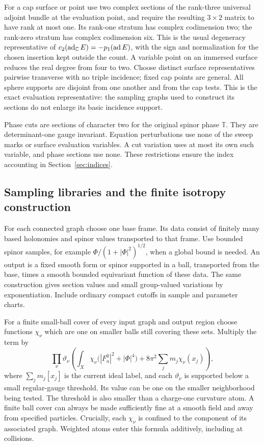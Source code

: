 For a cap surface or point use two complex sections of the rank-three
universal adjoint bundle at the evaluation point, and require the
resulting $3\times2$ matrix to have rank at most one.  Its rank-one
stratum has complex codimension two; the rank-zero stratum has complex
codimension six.  This is the usual degeneracy representative of
$c_2(\operatorname{ad}_{\mathbb C}E)=-p_1(\operatorname{ad} E)$, with the sign and normalization for the
chosen insertion kept outside the count.  A variable point on an
immersed surface reduces the real degree from four to two.  Choose
distinct surface representatives pairwise transverse with no triple
incidence; fixed cap points are general.  All sphere supports are
disjoint from one another and from the cap tests.  This is the exact
evaluation representative: the sampling graphs used to construct its
sections do not enlarge its basic incidence support.

Phase cuts are sections of character two for the original spinor phase
$\mathbb T$.  They are determinant-one gauge invariant.  Equation
perturbations use none of the sweep marks or surface evaluation variables.
A cut variation uses at most its own such variable, and phase sections
use none.  These restrictions ensure the index accounting in
Section~\ref{sec:indices}.

\subsection{Sampling libraries and the finite isotropy construction}

For each connected graph choose one base frame.  Its data consist of
finitely many based holonomies and spinor values transported to that
frame.  Use bounded spinor samples, for example
$\Phi/(1+|\Phi|^2)^{1/2}$, when a global bound is needed.  An output is
a fixed smooth form or spinor supported in a ball, transported from the
base, times a smooth bounded equivariant function of these data.  The
same construction gives section values and small group-valued variations
by exponentiation.  Include ordinary compact cutoffs in sample and
parameter charts.

For a finite small-ball cover of every input graph and output region
choose functions $\chi_\nu$ which are one on smaller balls still covering
these sets.  Multiply the term by
\begin{equation}\label{eq:analysis:energy-cutoff}
 \prod_\nu\vartheta_\nu\left(
  \int_X\chi_\nu\bigl(|F_a^0|^2+|\Phi|^4\bigr)
          +8\pi^2\sum_j m_j\chi_\nu(x_j)\right),
\end{equation}
where $\sum_jm_j[x_j]$ is the current ideal label, and each
$\vartheta_\nu$ is supported below a small regular-gauge threshold.
Its value can be one on the smaller neighborhood being tested.  The
threshold is also smaller than a charge-one curvature atom.  A finite
ball cover can always be made sufficiently fine at a smooth field and
away from specified particles.  Crucially, each $\chi_\nu$ is confined
to the component of its associated graph.  Weighted atoms enter this
formula additively, including at collisions.

